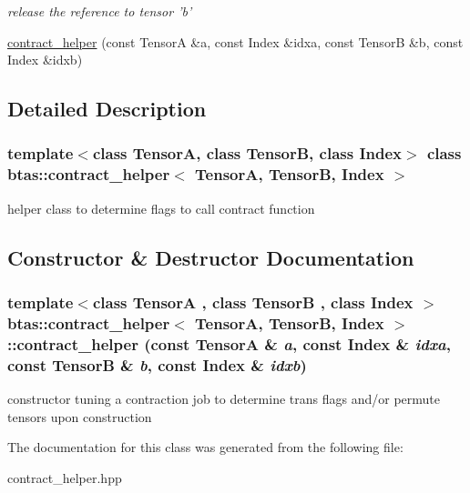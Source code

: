 \begin{DoxyCompactItemize}
\begin{DoxyCompactList}\small\item\em release the reference to tensor 'b' \item\end{DoxyCompactList}\item 
\hyperlink{classbtas_1_1contract__helper_ac261dea905460f76b6bcfb46598df784}{contract\_\-helper} (const TensorA \&a, const Index \&idxa, const TensorB \&b, const Index \&idxb)
\end{DoxyCompactItemize}


\subsection{Detailed Description}
\subsubsection*{template$<$class TensorA, class TensorB, class Index$>$ class btas::contract\_\-helper$<$ TensorA, TensorB, Index $>$}

helper class to determine flags to call contract function 

\subsection{Constructor \& Destructor Documentation}
\hypertarget{classbtas_1_1contract__helper_ac261dea905460f76b6bcfb46598df784}{
\subsubsection[{contract\_\-helper}]{\setlength{\rightskip}{0pt plus 5cm}template$<$class TensorA , class TensorB , class Index $>$ {\bf btas::contract\_\-helper}$<$ TensorA, TensorB, Index $>$::{\bf contract\_\-helper} (const TensorA \& {\em a}, \/  const Index \& {\em idxa}, \/  const TensorB \& {\em b}, \/  const Index \& {\em idxb})}}
\label{classbtas_1_1contract__helper_ac261dea905460f76b6bcfb46598df784}
constructor tuning a contraction job to determine trans flags and/or permute tensors upon construction 

The documentation for this class was generated from the following file:\begin{DoxyCompactItemize}
\item 
contract\_\-helper.hpp\end{DoxyCompactItemize}
